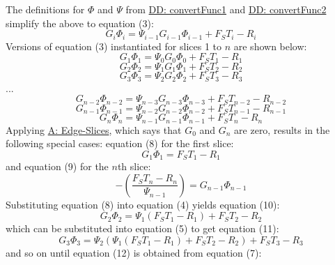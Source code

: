 \documentclass[12pt]{article}
\begin{document}
The definitions for $Φ$ and $Ψ$ from \hyperref[DD:convertFunc1]{DD: convertFunc1} and \hyperref[DD:convertFunc2]{DD: convertFunc2} simplify the above to equation (3):
\begin{displaymath}
G_{i} Φ_{i}=Ψ_{i-1} G_{i-1} Φ_{i-1}+{F_{S}} T_{i}-R_{i}
\end{displaymath}
Versions of equation (3) instantiated for slices 1 to $n$ are shown below:
\begin{displaymath}
G_{1} Φ_{1}=Ψ_{0} G_{0} Φ_{0}+{F_{S}} T_{1}-R_{1}
\end{displaymath}
\begin{displaymath}
G_{2} Φ_{2}=Ψ_{1} G_{1} Φ_{1}+{F_{S}} T_{2}-R_{2}
\end{displaymath}
\begin{displaymath}
G_{3} Φ_{3}=Ψ_{2} G_{2} Φ_{2}+{F_{S}} T_{3}-R_{3}
\end{displaymath}
...
\begin{displaymath}
G_{n-2} Φ_{n-2}=Ψ_{n-3} G_{n-3} Φ_{n-3}+{F_{S}} T_{n-2}-R_{n-2}
\end{displaymath}
\begin{displaymath}
G_{n-1} Φ_{n-1}=Ψ_{n-2} G_{n-2} Φ_{n-2}+{F_{S}} T_{n-1}-R_{n-1}
\end{displaymath}
\begin{displaymath}
G_{n} Φ_{n}=Ψ_{n-1} G_{n-1} Φ_{n-1}+{F_{S}} T_{n}-R_{n}
\end{displaymath}
Applying \hyperref[A:Edge-Slices]{A: Edge-Slices}, which says that $G_{0}$ and $G_{n}$ are zero, results in the following special cases: equation (8) for the first slice:
\begin{displaymath}
G_{1} Φ_{1}={F_{S}} T_{1}-R_{1}
\end{displaymath}
and equation (9) for the $n$th slice:
\begin{displaymath}
-\left(\frac{{F_{S}} T_{n}-R_{n}}{Ψ_{n-1}}\right)=G_{n-1} Φ_{n-1}
\end{displaymath}
Substituting equation (8) into equation (4) yields equation (10):
\begin{displaymath}
G_{2} Φ_{2}=Ψ_{1} \left({F_{S}} T_{1}-R_{1}\right)+{F_{S}} T_{2}-R_{2}
\end{displaymath}
which can be substituted into equation (5) to get equation (11):
\begin{displaymath}
G_{3} Φ_{3}=Ψ_{2} \left(Ψ_{1} \left({F_{S}} T_{1}-R_{1}\right)+{F_{S}} T_{2}-R_{2}\right)+{F_{S}} T_{3}-R_{3}
\end{displaymath}
and so on until equation (12) is obtained from equation (7):
\end{document}
